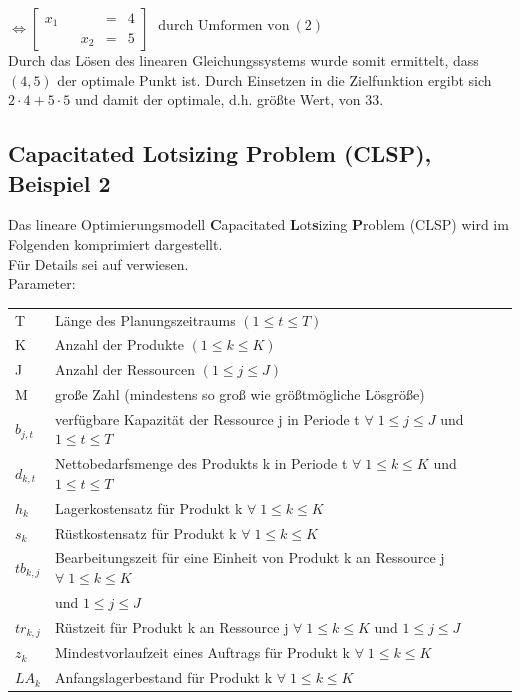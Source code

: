 		$\Leftrightarrow
		\begin{bmatrix}
			x_1 & & & = & 4 \\
			& & x_2 & = & 5 
		\end{bmatrix}
		\begin{matrix}
			\ \text{durch Umformen von} \ (2)   \\
			& 
		\end{matrix}$\\

		Durch das Lösen des linearen Gleichungssystems wurde somit ermittelt, dass $(4,5)$ der optimale Punkt ist. Durch Einsetzen in die Zielfunktion ergibt sich $2 \cdot 4 + 5 \cdot 5$
		und damit der optimale, d.h. größte Wert, von 33. \\
		
		
		\subsection{Capacitated Lotsizing Problem (CLSP), Beispiel 2}
		Das lineare Optimierungsmodell \textbf{C}apacitated \textbf{L}ot\textbf{s}izing \textbf{P}roblem (CLSP) wird im Folgenden komprimiert dargestellt.\\ 
		Für Details sei auf \cite{Herrmann.2009} verwiesen. \\

		Parameter: 
		\begin{longtable}{ l l }
			T & Länge des Planungszeitraums $(1 \le t \le T)$ \\
			K & Anzahl der Produkte $(1 \le k \le K)$ \\
			J & Anzahl der Ressourcen $(1 \le j \le J)$ \\
			M & große Zahl (mindestens so groß wie größtmögliche Lösgröße) \\
			$b_{j,t}$ & verfügbare Kapazität der Ressource j in Periode t $\forall\; 1 \le j \le J$ und $1 \le t \le T$ \\
			$d_{k,t}$ & Nettobedarfsmenge des Produkts k in Periode t $\forall\; 1 \le k \le K$ und $1 \le t \le T$ \\
			$h_{k}$ & Lagerkostensatz für Produkt k $\forall\; 1 \le k \le K$ \\
			$s_{k}$ & Rüstkostensatz für Produkt k $\forall\; 1 \le k \le K$ \\
			$tb_{k,j}$ & Bearbeitungszeit für eine Einheit von Produkt k an Ressource j $\forall\; 1 \le k \le K$ \\
			& und $1 \le j \le J$\\
			$tr_{k,j}$ & Rüstzeit für Produkt k an Ressource j $\forall\; 1 \le k \le K$  und $1 \le j \le J$ \\
			$z_{k}$ & Mindestvorlaufzeit eines Auftrags für Produkt k $\forall\; 1 \le k \le K$\\
			$LA_{k}$ & Anfangslagerbestand für Produkt k $\forall\; 1 \le k \le K$ 
		\end{longtable}
		\addtocounter{table}{-1} %
		
